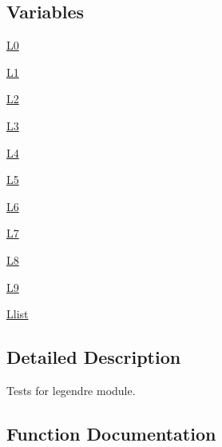 \subsection*{Variables}
\begin{DoxyCompactItemize}
\item 
\hyperlink{namespacenumpy_1_1polynomial_1_1tests_1_1test__legendre_ad2ec69ae43807a84c52f9d041dcc59f9}{L0}
\item 
\hyperlink{namespacenumpy_1_1polynomial_1_1tests_1_1test__legendre_a2b2f02ed1f54f05f8e9abaee9a79b0fe}{L1}
\item 
\hyperlink{namespacenumpy_1_1polynomial_1_1tests_1_1test__legendre_a24f447d76ca84e0d4f7c8c4f2d2e47b3}{L2}
\item 
\hyperlink{namespacenumpy_1_1polynomial_1_1tests_1_1test__legendre_a0b06eb2a1a773cd7f22173b10ccb5bdf}{L3}
\item 
\hyperlink{namespacenumpy_1_1polynomial_1_1tests_1_1test__legendre_a5a3bfaad5e10e70a975e755f22c6b0db}{L4}
\item 
\hyperlink{namespacenumpy_1_1polynomial_1_1tests_1_1test__legendre_a666be9ee3112469c164050803fda7096}{L5}
\item 
\hyperlink{namespacenumpy_1_1polynomial_1_1tests_1_1test__legendre_af7c502290a7e51d4c3792d3e0e00c1d7}{L6}
\item 
\hyperlink{namespacenumpy_1_1polynomial_1_1tests_1_1test__legendre_a34612def850130e9af0868bf779ff894}{L7}
\item 
\hyperlink{namespacenumpy_1_1polynomial_1_1tests_1_1test__legendre_a244802c4cccd6e7ab78338331a21c5ff}{L8}
\item 
\hyperlink{namespacenumpy_1_1polynomial_1_1tests_1_1test__legendre_a86d9027090a85197581157c2aa69fc03}{L9}
\item 
\hyperlink{namespacenumpy_1_1polynomial_1_1tests_1_1test__legendre_a0311aa73b312ab60d3300a9ec2a51d84}{Llist}
\end{DoxyCompactItemize}


\subsection{Detailed Description}
\begin{DoxyVerb}Tests for legendre module.\end{DoxyVerb}
 

\subsection{Function Documentation}
\mbox{\label{namespacenumpy_1_1polynomial_1_1tests_1_1test__legendre_af377735a2022019187339471418e5066}} 
